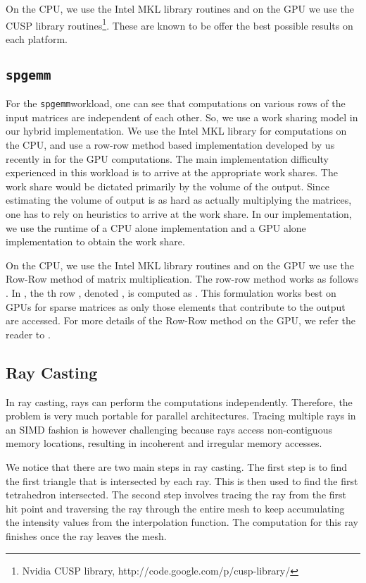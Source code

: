 \documentclass[11pt]{article}
\newcommand{\sgemm} {{\tt spgemm}}
\begin{document}
On the CPU, we use the Intel MKL \cite{mkl} library routines and on the GPU we use
the CUSP library routines\footnote{Nvidia CUSP library,
http://code.google.com/p/cusp-library/}. These are known to be offer the best possible
results on each platform.

\subsection{\sgemm}
For the \sgemm workload, one can see that computations on various rows of
the input matrices are independent of each other. So, we use a work sharing
model in our hybrid implementation. We use the Intel MKL library \cite{mkl}
for computations on the CPU, and use a row-row method based implementation
developed by us recently in \cite{sgemm} for the GPU computations. The main
implementation difficulty experienced in this workload is to arrive at the
appropriate work shares. The work share would be dictated primarily by the
volume of the output. Since estimating the volume of output is as hard as
actually multiplying the matrices, one has to rely on heuristics to arrive at
the work share. In our implementation, we use the runtime of a CPU alone
implementation and a GPU alone implementation to obtain the work share. 

On the CPU, we use the Intel MKL \cite{mkl} library routines and on the GPU we use
the Row-Row method of matrix multiplication. The row-row method works as
follows \cite{sgemm}. In , the th row , denoted , is computed as
. This formulation works best
on GPUs for sparse matrices as only those elements that contribute to
the output are  accessed. For more details of the Row-Row method on the
GPU, we refer the reader to \cite{sgemm}.

\subsection{Ray Casting}
In ray casting, rays can perform the computations independently. Therefore,
the problem is very much portable for parallel architectures. Tracing
multiple rays in an SIMD fashion is however challenging because rays access non-contiguous
memory locations, resulting in incoherent and irregular memory accesses.

We notice that there are two main steps in ray casting. The first step is to
find the first triangle that is intersected by each ray. This is then used to
find the first tetrahedron intersected. The second step involves tracing the
ray from the first hit point and traversing the ray through the entire mesh to keep
accumulating the intensity values from the interpolation function. The computation
for this ray finishes  once the ray leaves the mesh. 
\end{document}
